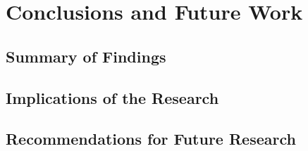 %
%
\chapter{Conclusions and Future Work}
    \section{Summary of Findings}
    \section{Implications of the Research}
    \section{Recommendations for Future Research}
\cleardoublepage